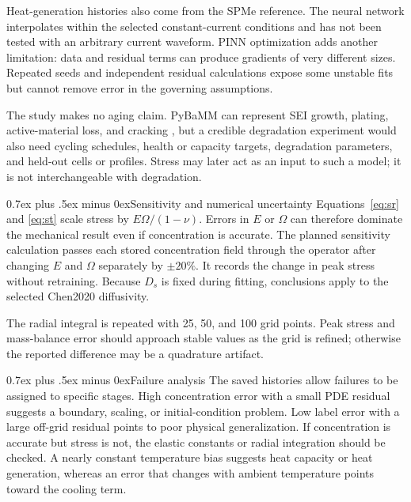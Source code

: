 \documentclass[conference]{IEEEtran}
\makeatletter
\newcommand{\headingfont}{\rmfamily}
\def\subsection{\@startsection{subsection}{2}{\z@}{1.5ex plus 1.5ex minus 0.5ex}%
{0.7ex plus .5ex minus 0ex}{\normalfont\headingfont\normalsize\bfseries}}
\makeatother
\begin{document}
Heat-generation histories also come from the SPMe reference. The neural network interpolates within the selected constant-current conditions and has not been tested with an arbitrary current waveform. PINN optimization adds another limitation: data and residual terms can produce gradients of very different sizes. Repeated seeds and independent residual calculations expose some unstable fits but cannot remove error in the governing assumptions.

The study makes no aging claim. PyBaMM can represent SEI growth, plating, active-material loss, and cracking \cite{sulzer2021pybamm}, but a credible degradation experiment would also need cycling schedules, health or capacity targets, degradation parameters, and held-out cells or profiles. Stress may later act as an input to such a model; it is not interchangeable with degradation.

\subsection{Sensitivity and numerical uncertainty}
Equations~\eqref{eq:sr} and \eqref{eq:st} scale stress by $E\Omega/(1-\nu)$. Errors in $E$ or $\Omega$ can therefore dominate the mechanical result even if concentration is accurate. The planned sensitivity calculation passes each stored concentration field through the operator after changing $E$ and $\Omega$ separately by $\pm20\%$. It records the change in peak stress without retraining. Because $D_s$ is fixed during fitting, conclusions apply to the selected Chen2020 diffusivity.

The radial integral is repeated with 25, 50, and 100 grid points. Peak stress and mass-balance error should approach stable values as the grid is refined; otherwise the reported difference may be a quadrature artifact.

\subsection{Failure analysis}
The saved histories allow failures to be assigned to specific stages. High concentration error with a small PDE residual suggests a boundary, scaling, or initial-condition problem. Low label error with a large off-grid residual points to poor physical generalization. If concentration is accurate but stress is not, the elastic constants or radial integration should be checked. A nearly constant temperature bias suggests heat capacity or heat generation, whereas an error that changes with ambient temperature points toward the cooling term.
\end{document}
